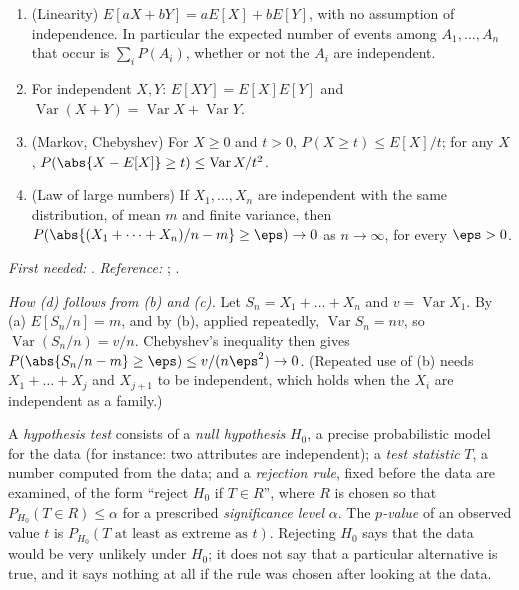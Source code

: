 \begin{theorem}\label{thm:prereq:expectation}
\begin{enumerate}[label=(\alph*)]
\item (Linearity) $E[aX+bY]=aE[X]+bE[Y]$, with no assumption of independence. In particular the
expected number of events among $A_1,\dots,A_n$ that occur is $\sum_iP(A_i)$, whether or not the
$A_i$ are independent.
\item For independent $X,Y$: $E[XY]=E[X]E[Y]$ and $\operatorname{Var}(X+Y)=\operatorname{Var}X+\operatorname{Var}Y$.
\item (Markov, Chebyshev) For $X\ge0$ and $t>0$, $P(X\ge t)\le E[X]/t$; for any $X$,
$P(\abs{X-E[X]}\ge t)\le\operatorname{Var}X/t^2$.
\item (Law of large numbers) If $X_1,\dots,X_n$ are independent with the same distribution, of mean
$m$ and finite variance, then $P(\abs{(X_1+\dots+X_n)/n-m}\ge\eps)\to0$ as $n\to\infty$, for every
$\eps>0$.
\end{enumerate}
\end{theorem}
\noindent\emph{First needed:} . \emph{Reference:} \cite[Chapters I, V and
IX]{Feller68}; \cite[Chapter 30]{RHB06}.

\emph{How (d) follows from (b) and (c).} Let $S_n=X_1+\dots+X_n$ and $v=\operatorname{Var}X_1$. By (a)
$E[S_n/n]=m$, and by (b), applied repeatedly, $\operatorname{Var}S_n=nv$, so
$\operatorname{Var}(S_n/n)=v/n$. Chebyshev's inequality then gives
$P(\abs{S_n/n-m}\ge\eps)\le v/(n\eps^2)\to0$. (Repeated use of (b) needs $X_1+\dots+X_{j}$ and
$X_{j+1}$ to be independent, which holds when the $X_i$ are independent as a family.)

\begin{definition}\label{def:prereq:test}
A \emph{hypothesis test} consists of a \emph{null hypothesis} $H_0$, a precise probabilistic model
for the data (for instance: two attributes are independent); a \emph{test statistic} $T$, a number
computed from the data; and a \emph{rejection rule}, fixed before the data are examined, of the form
``reject $H_0$ if $T\in R$'', where $R$ is chosen so that $P_{H_0}(T\in R)\le\alpha$ for a
prescribed \emph{significance level} $\alpha$. The \emph{$p$-value} of an observed value $t$ is
$P_{H_0}(T\text{ at least as extreme as }t)$. Rejecting $H_0$ says that the data would be very
unlikely under $H_0$; it does not say that a particular alternative is true, and it says nothing at
all if the rule was chosen after looking at the data.
\end{definition}

